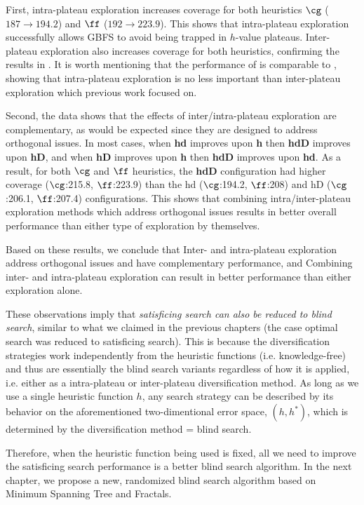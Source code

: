 % 


First, 
% 
intra-plateau exploration  increases coverage for both heuristics
$\cg$ ($187 \rightarrow 194.2$) and $\ff$ ($192 \rightarrow 223.9$).
This shows that intra-plateau exploration successfully allows GBFS to avoid being trapped in $h$-value plateaus.
Inter-plateau exploration  also increases coverage for both heuristics, confirming the results in \cite{xie14type}.
It is worth mentioning that the performance of  is comparable to , showing that intra-plateau exploration is no less important than inter-plateau exploration which previous work focused on.

Second, the data shows that the effects of inter/intra-plateau exploration are complementary, 
as would be expected since they are designed to address orthogonal issues.
In most cases,
when \textbf{hd} improves upon \textbf{h} then \textbf{hdD} improves upon \textbf{hD},
and when \textbf{hD} improves upon \textbf{h} then \textbf{hdD} improves upon \textbf{hd}.
As a result, for both $\cg$ and $\ff$ heuristics, the \textbf{hdD} configuration had higher coverage ($\cg$:215.8, $\ff$:223.9) than the hd ($\cg$:194.2, $\ff$:208) and hD ($\cg$:206.1, $\ff$:207.4) configurations. 
This shows that combining intra/inter-plateau exploration methods which address orthogonal issues results in better overall performance than either type of exploration by themselves.

Based on these results, we conclude that
Inter- and intra-plateau exploration address orthogonal issues and have complementary performance, and
Combining inter- and intra-plateau exploration can result in better performance than either exploration alone.

These observations imply that
\emph{satisficing search can also be reduced to blind search}, similar
to what we claimed in the previous chapters (the case optimal search was reduced to satisficing search).
This is because the diversification strategies work independently from the heuristic functions (i.e. knowledge-free)
and thus are essentially the blind search variants regardless of how it is applied, i.e. either as a intra-plateau or inter-plateau diversification method.
As long as we use a single heuristic function $h$, any search strategy can be described
by its behavior on the aforementioned two-dimentional error space, $(h,h^*)$,
which is determined by the diversification method = blind search.

Therefore, when the heuristic function being used is fixed,
all we need to improve the satisficing search performance is a better blind
search algorithm.  In the next chapter, we propose a new, randomized
blind search algorithm based on Minimum Spanning Tree and Fractals.


